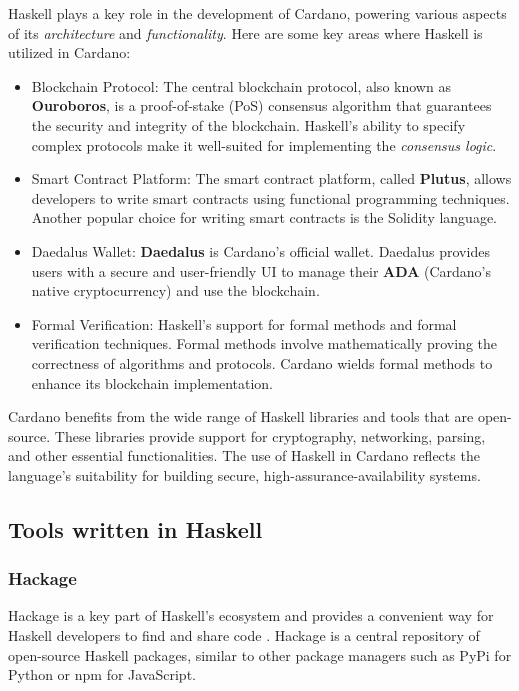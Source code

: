 \documentclass[a4paper, titlepage, twoside]{article}
\begin{document}
Haskell plays a key role in the development of Cardano, powering various aspects of its \emph{architecture} and \emph{functionality}. Here are some key areas where Haskell is utilized in Cardano:

\begin{itemize}
\item Blockchain Protocol: The central blockchain protocol, also known as \textbf{Ouroboros}, is a proof-of-stake (PoS) consensus algorithm that guarantees the security and integrity of the blockchain. Haskell's ability to specify complex protocols make it well-suited for implementing the \emph{consensus logic}.

\item Smart Contract Platform: The smart contract platform, called \textbf{Plutus}, allows developers to write smart contracts using functional programming techniques. Another popular choice for writing smart contracts is the Solidity language.

\item Daedalus Wallet: \textbf{Daedalus} is Cardano's official wallet. Daedalus provides users with a secure and user-friendly UI to manage their \textbf{ADA} (Cardano's native cryptocurrency) and use the blockchain.

\item Formal Verification: Haskell's support for formal methods and formal verification techniques. Formal methods involve mathematically proving the correctness of algorithms and protocols. Cardano wields formal methods to enhance its blockchain implementation.
\end{itemize}

Cardano benefits from the wide range of Haskell libraries and tools that are open-source. These libraries provide support for cryptography, networking, parsing, and other essential functionalities. The use of Haskell in Cardano reflects the language's suitability for building secure, high-assurance-availability systems.

\subsection{Tools written in Haskell}
\label{sec:org5d48158}

\subsubsection{Hackage}
\label{sec:org1ed7a8c}

Hackage is a key part of Haskell's ecosystem and provides a convenient way for Haskell developers to find and share code \autocite{hackageHackage2023}. Hackage is a central repository of open-source Haskell packages, similar to other package managers such as PyPi for Python or npm for JavaScript.
\end{document}
